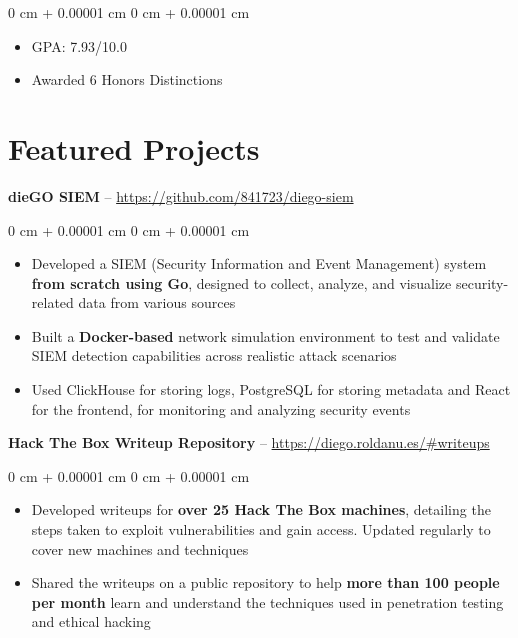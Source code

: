 \documentclass[10pt,a4paper,sans]{article}
\newenvironment{highlights}{
    \begin{itemize}[
        topsep=0.10 cm,
        parsep=0.10 cm,
        partopsep=0pt,
        itemsep=0pt,
        leftmargin=0 cm + 18pt
    ]
}{
    \end{itemize}
} %
\newenvironment{onecolentry}{
    \begin{adjustwidth}{
        0 cm + 0.00001 cm
    }{
        0 cm + 0.00001 cm
    }
}{
    \end{adjustwidth}
} %
\begin{document}
        \vspace{0.10 cm}
        \begin{onecolentry}
            \begin{highlights} 
                \item GPA: 7.93/10.0
                \item Awarded 6 Honors Distinctions
            \end{highlights}
        \end{onecolentry}
    
    \section{Featured Projects}       
        \textbf{dieGO SIEM} -- \href{https://github.com/841723/diego-siem}{https://github.com/841723/diego-siem}

        \vspace{0.10 cm}
        \begin{onecolentry}
            \begin{highlights}
                \item Developed a SIEM (Security Information and Event Management) system \textbf{from scratch using Go}, designed to collect, analyze, and visualize security-related data from various sources
                \item Built a \textbf{Docker-based} network simulation environment to test and validate SIEM detection capabilities across realistic attack scenarios
                \item Used ClickHouse for storing logs, PostgreSQL for storing metadata and React for the frontend, for monitoring and analyzing security events
            \end{highlights}
        \end{onecolentry}

        \vspace{0.3 cm}
        
        \textbf{Hack The Box Writeup Repository} -- \href{https://diego.roldanu.es/\#writeups}{https://diego.roldanu.es/\#writeups}
        \vspace{0.10 cm}
        \begin{onecolentry}
            \begin{highlights}
                \item Developed writeups for \textbf{over 25 Hack The Box machines}, detailing the steps taken to exploit vulnerabilities and gain access. Updated regularly to cover new machines and techniques
                \item Shared the writeups on a public repository to help \textbf{more than 100 people per month} learn and understand the techniques used in penetration testing and ethical hacking
            \end{highlights}
        \end{onecolentry}
\end{document}

